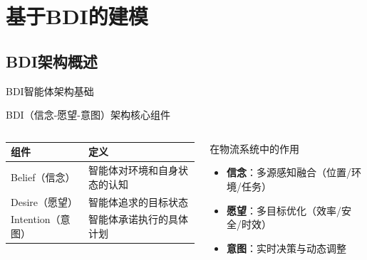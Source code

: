 \documentclass[
10pt,
aspectratio=169,
]{beamer}
\begin{document}
\section{基于BDI的建模}
\subsection{BDI架构概述}

\begin{frame}{BDI智能体架构基础}
    \begin{block}{BDI（信念-愿望-意图）架构核心组件}
        \begin{columns}
            \begin{column}{0.45\textwidth}
                \begin{center}
                \small
                \begin{tabular}{|>{\centering\arraybackslash}p{2.5cm}|>{\raggedright\arraybackslash}p{3.5cm}|}
                \hline
                \textbf{组件} & \textbf{定义} \\
                \hline
                \rowcolor{lightgray}
                Belief（信念） & 智能体对环境和自身状态的认知 \\
                \hline
                Desire（愿望） & 智能体追求的目标状态 \\
                \hline
                \rowcolor{lightgray}
                Intention（意图） & 智能体承诺执行的具体计划 \\
                \hline
                \end{tabular}
                \end{center}
            \end{column}
            \begin{column}{0.55\textwidth}
                \begin{alertblock}{在物流系统中的作用}
                    \begin{itemize}
                        \item \textbf{信念}：多源感知融合（位置/环境/任务）
                        \item \textbf{愿望}：多目标优化（效率/安全/时效）
                        \item \textbf{意图}：实时决策与动态调整
                    \end{itemize}
                \end{alertblock}
            \end{column}
        \end{columns}
    \end{block}
    

\end{frame}
\end{document}
